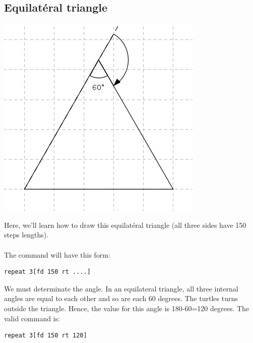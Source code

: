 \subsection{Equilatéral triangle}
\begin{center}
\includegraphics{pics/bases-triangle.png}
\end{center}
\noindent Here, we'll learn how to draw this equilatéral triangle (all three sides have 150 steps lengths).\\ \\
The command will have this form: 
\begin{verbatim}
repeat 3[fd 150 rt ....]
\end{verbatim}
We must determinate the angle. In an equilateral triangle, all three internal angles are equal to each other and so are each 60 degrees. The turtles turns outside the triangle. Hence, the value for this angle is 180-60=120 degrees. The valid command is:
\begin{verbatim}
repeat 3[fd 150 rt 120]
\end{verbatim}

